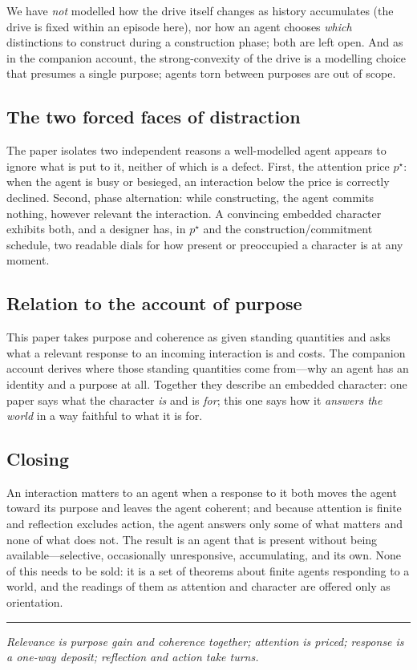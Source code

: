 \documentclass[11pt,twocolumn,a4paper]{article}
\begin{document}
We have \emph{not} modelled how the drive itself changes as history
accumulates (the drive is fixed within an episode here), nor how an agent
chooses \emph{which} distinctions to construct during a construction phase;
both are left open. And as in the companion account, the strong-convexity
of the drive is a modelling choice that presumes a single purpose; agents
torn between purposes are out of scope.

\subsection{The two forced faces of distraction}

The paper isolates two independent reasons a well-modelled agent appears to
ignore what is put to it, neither of which is a defect. First, the
attention price $p^\star$: when the agent is busy or besieged, an
interaction below the price is correctly declined. Second, phase
alternation: while constructing, the agent commits nothing, however
relevant the interaction. A convincing embedded character exhibits both,
and a designer has, in $p^\star$ and the construction/commitment schedule,
two readable dials for how present or preoccupied a character is at any
moment.

\subsection{Relation to the account of purpose}

This paper takes purpose and coherence as given standing quantities and
asks what a relevant response to an incoming interaction is and costs. The
companion account derives where those standing quantities come from---why
an agent has an identity and a purpose at all. Together they describe an
embedded character: one paper says what the character \emph{is} and is
\emph{for}; this one says how it \emph{answers the world} in a way faithful
to what it is for.

\subsection{Closing}

An interaction matters to an agent when a response to it both moves the
agent toward its purpose and leaves the agent coherent; and because
attention is finite and reflection excludes action, the agent answers only
some of what matters and none of what does not. The result is an agent that
is present without being available---selective, occasionally
unresponsive, accumulating, and its own. None of this needs to be sold: it
is a set of theorems about finite agents responding to a world, and the
readings of them as attention and character are offered only as
orientation.

\vspace{0.6em}
\hrule
\vspace{0.4em}
\noindent\emph{Relevance is purpose gain and coherence together; attention
is priced; response is a one-way deposit; reflection and action take
turns.}



\end{document}
